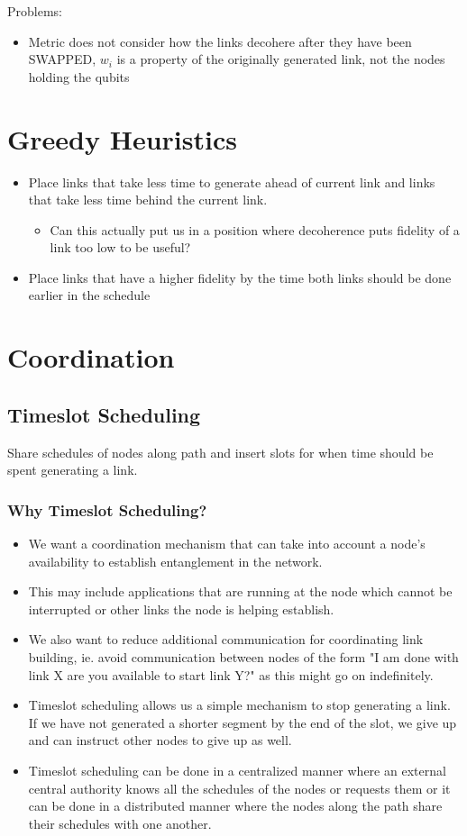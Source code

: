 \documentclass{article}
\begin{document}
Problems:
\begin{itemize}
    \item Metric does not consider how the links decohere after they have been SWAPPED, $w_i$ is a property of the
    originally generated link, not the nodes holding the qubits
\end{itemize}

\section{Greedy Heuristics}
\begin{itemize}
    \item Place links that take less time to generate ahead of current link and links that take less time behind the current link.
    \begin{itemize}
        \item Can this actually put us in a position where decoherence puts fidelity of a link too low to be useful?
    \end{itemize}
    \item Place links that have a higher fidelity by the time both links should be done earlier in the schedule
\end{itemize}

\section{Coordination}
\subsection{Timeslot Scheduling}
Share schedules of nodes along path and insert slots for when time should be spent generating a link.

\subsubsection{Why Timeslot Scheduling?}
\begin{itemize}
    \item We want a coordination mechanism that can take into account a node's availability to establish entanglement in the network.
    \item This may include applications that are running at the node which cannot be interrupted or other links the node is helping establish.
    \item We also want to reduce additional communication for coordinating link building, ie. avoid communication between nodes of the form "I am done with link X are you available to start link Y?" as this might go on indefinitely.
    \item Timeslot scheduling allows us a simple mechanism to stop generating a link.  If we have not generated a shorter segment by the end of the slot, we give up and can instruct other nodes to give up as well.
    \item Timeslot scheduling can be done in a centralized manner where an external central authority knows all the schedules of the nodes or requests them or it can be done in a distributed manner where the nodes along the path share their schedules with one another.
\end{itemize}
\end{document}
